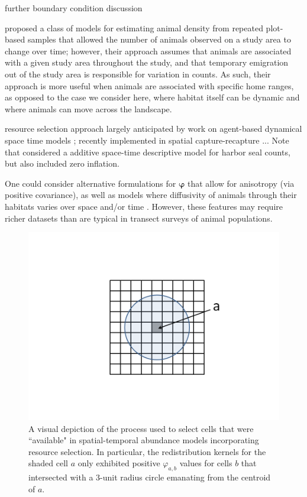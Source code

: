 \documentclass[times,mee,doublespace,]{besauth2}
\begin{document}
further boundary condition discussion

\citet{ChandlerEtAl2011} proposed a class of models for estimating animal density from repeated plot-based samples that allowed the number of animals observed on a study area to change over time; however, their approach assumes that animals are associated with a given study area throughout the study, and that temporary emigration out of the study area is responsible for variation in counts.  As such, their approach is more useful when animals are associated with specific home ranges, as opposed to the case we consider here, where habitat itself can be dynamic and where animals can move across the landscape.

resource selection approach largely anticipated by work on agent-based dynamical space time models  \citep{HootenWikle2010}; recently implemented in spatial capture-recapture \citep{RoyleEtAl2013}... Note that \citet{VerHoefJansen2007} considered a additive space-time descriptive model for harbor seal counts, but also included zero inflation.

One could consider alternative formulations for $\boldsymbol{\varphi}$ that allow for anisotropy (via positive covariance), as well as models where diffusivity of animals through their habitats varies over space and/or time \citep[see e.g.][]{WikleEtAl2001}.  However, these features may require richer datasets than are typical in transect surveys of animal populations.





\pagebreak
\begin{figure}
\begin{center}
\includegraphics[width=170mm]{rs_kernel.png}
\caption{A visual depiction of the process used to select cells that were ``available" in spatial-temporal abundance models incorporating resource selection.  In particular, the redistribution kernels for the shaded cell $a$ only exhibited positive $\varphi_{a,b}$ values for cells $b$ that intersected with a 3-unit radius circle emanating from the centroid of $a$.} \label{fig:res-sel}
\end{center}
\end{figure}
\end{document}
